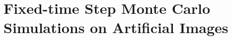 \documentclass{uofsthesis-cs}
\begin{document}
  

  



  
\chapter{Fixed-time Step Monte Carlo Simulations on Artificial Images}

  
  


  
  
  
  










%

\end{document}

